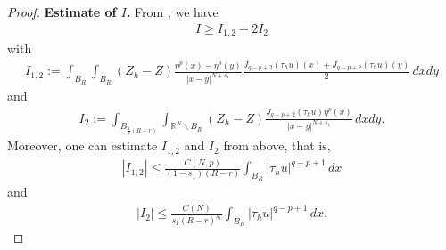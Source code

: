 \documentclass[reqno,10pt]{amsart}
\numberwithin{equation}{section}
\begin{document}
\begin{proof}
\noindent	\textbf{Estimate of $I$.} From \cite[Proof of Proposition 4.2]{LZ25}, we have
	\begin{align}
		\label{9.4}
		I\ge I_{1,2}+2I_2
	\end{align}
	with
	\begin{align*}
		I_{1,2}:=\int_{B_R}\int_{B_R}(Z_h-Z)\frac{\eta^p(x)-\eta^p(y)}{|x-y|^{N+s_1}}\frac{J_{q-p+2}(\tau_hu)(x)+J_{q-p+2}(\tau_hu)(y)}{2}\,dxdy
	\end{align*}
	and
	\begin{align*}
		I_2:=\int_{B_{\frac{1}{2}(R+r)}}\int_{\mathbb{R}^N\backslash B_R}(Z_h-Z)\frac{J_{q-p+2}(\tau_hu)\eta^p(x)}{|x-y|^{N+s_1}}\,dxdy.
	\end{align*}
	Moreover, one can estimate $I_{1,2}$ and $I_2$ from above, that is,
	\begin{align*}
		|I_{1,2}|\le \frac{C(N,p)}{(1-s_1)(R-r)}\int_{B_R}|\tau_hu|^{q-p+1}\,dx
	\end{align*}
	and
	\begin{align*}
		|I_2|\le \frac{C(N)}{s_1(R-r)^{s_1}}\int_{B_R}|\tau_hu|^{q-p+1}\,dx.
	\end{align*}

\smallskip


\end{proof}
\end{document}
